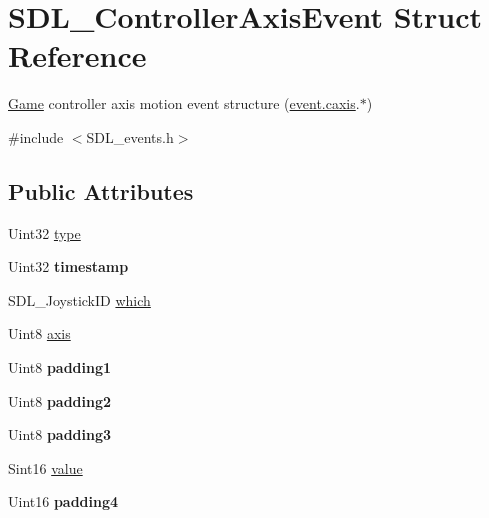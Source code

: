 \hypertarget{structSDL__ControllerAxisEvent}{\section{S\+D\+L\+\_\+\+Controller\+Axis\+Event Struct Reference}
\label{structSDL__ControllerAxisEvent}
}


\hyperlink{classGame}{Game} controller axis motion event structure (\hyperlink{unionSDL__Event_aa8f6df0f2716fae56204b12ab4a4c289}{event.\+caxis}.$\ast$)  




{\ttfamily \#include $<$S\+D\+L\+\_\+events.\+h$>$}

\subsection*{Public Attributes}
\begin{DoxyCompactItemize}
\item 
Uint32 \hyperlink{structSDL__ControllerAxisEvent_aa904b61e4763d28d887cf8afcc3cbb7c}{type}
\item 
\hypertarget{structSDL__ControllerAxisEvent_afc92dba0b4d1652a1ecf9e85606d1f14}{Uint32 {\bfseries timestamp}}\label{structSDL__ControllerAxisEvent_afc92dba0b4d1652a1ecf9e85606d1f14}

\item 
S\+D\+L\+\_\+\+Joystick\+I\+D \hyperlink{structSDL__ControllerAxisEvent_a07087f68ea9d64b50047d65312ee7b94}{which}
\item 
Uint8 \hyperlink{structSDL__ControllerAxisEvent_aba6543c143521aebce06a41a8cf79db0}{axis}
\item 
\hypertarget{structSDL__ControllerAxisEvent_af980495b1e24f9a868f2ccb25ce9629b}{Uint8 {\bfseries padding1}}\label{structSDL__ControllerAxisEvent_af980495b1e24f9a868f2ccb25ce9629b}

\item 
\hypertarget{structSDL__ControllerAxisEvent_a4a04fcd20a54db21c5258ab0e40c6ab5}{Uint8 {\bfseries padding2}}\label{structSDL__ControllerAxisEvent_a4a04fcd20a54db21c5258ab0e40c6ab5}

\item 
\hypertarget{structSDL__ControllerAxisEvent_ab82598fe5621dca9b1a41f7b2ca1e9a0}{Uint8 {\bfseries padding3}}\label{structSDL__ControllerAxisEvent_ab82598fe5621dca9b1a41f7b2ca1e9a0}

\item 
Sint16 \hyperlink{structSDL__ControllerAxisEvent_a1ed7f14255ed01b982d40a38791d475a}{value}
\item 
\hypertarget{structSDL__ControllerAxisEvent_ae0ad0f279b9978bbbac9f5b22ae8020b}{Uint16 {\bfseries padding4}}\label{structSDL__ControllerAxisEvent_ae0ad0f279b9978bbbac9f5b22ae8020b}

\end{DoxyCompactItemize}



